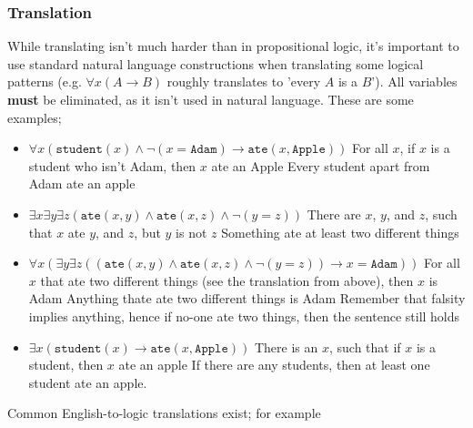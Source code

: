 \documentclass[a4paper, 12pt]{article}
\begin{document}
            \subsubsection*{Translation}
                While translating isn't much harder than in propositional logic, it's important to use standard natural language constructions when translating some logical patterns (e.g. $\forall x (A \rightarrow B)$ roughly translates to 'every $A$ is a $B$'). All variables \textbf{must} be eliminated, as it isn't used in natural language. These are some examples;
                \begin{itemize}
                    \itemsep0em
                    \item $\forall x (\texttt{student}(x) \land \neg (x = \texttt{Adam}) \rightarrow \texttt{ate}(x, \texttt{Apple}))$
                        \subitem For all $x$, if $x$ is a student who isn't Adam, then $x$ ate an Apple
                        \subitem Every student apart from Adam ate an apple
                    \item $\exists x \exists y \exists z (\texttt{ate}(x, y) \land \texttt{ate}(x, z) \land \neg (y = z))$
                        \subitem There are $x$, $y$, and $z$, such that $x$ ate $y$, and $z$, but $y$ is not $z$
                        \subitem Something ate at least two different things
                    \item $\forall x (\exists y \exists z ((\texttt{ate}(x, y) \land \texttt{ate}(x, z) \land \neg (y = z)) \rightarrow x = \texttt{Adam}))$
                        \subitem For all $x$ that ate two different things (see the translation from above), then $x$ is Adam
                        \subitem Anything thate ate two different things is Adam
                        \subitem Remember that falsity implies anything, hence if no-one ate two things, then the sentence still holds
                    \item $\exists x (\texttt{student}(x) \rightarrow \texttt{ate}(x, \texttt{Apple}))$
                        \subitem There is an $x$, such that if $x$ is a student, then $x$ ate an apple
                        \subitem If there are any students, then at least one student ate an apple.
                \end{itemize}
                Common English-to-logic translations exist; for example
\end{document}
